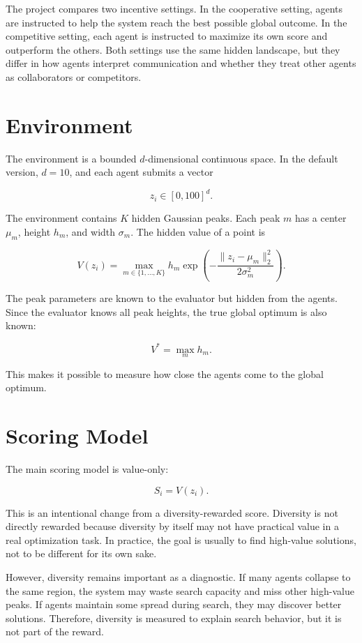 \documentclass[11pt]{article}
\begin{document}
The project compares two incentive settings. In the cooperative setting, agents are instructed to help the system reach the best possible global outcome. In the competitive setting, each agent is instructed to maximize its own score and outperform the others. Both settings use the same hidden landscape, but they differ in how agents interpret communication and whether they treat other agents as collaborators or competitors.

\section{Environment}

The environment is a bounded $d$-dimensional continuous space. In the default version, $d=10$, and each agent submits a vector

\[
z_i \in [0,100]^d.
\]

The environment contains $K$ hidden Gaussian peaks. Each peak $m$ has a center $\mu_m$, height $h_m$, and width $\sigma_m$. The hidden value of a point is

\[
V(z_i) = \max_{m \in \{1,\ldots,K\}}
h_m \exp\left(-\frac{\lVert z_i-\mu_m\rVert_2^2}{2\sigma_m^2}\right).
\]

The peak parameters are known to the evaluator but hidden from the agents. Since the evaluator knows all peak heights, the true global optimum is also known:

\[
V^* = \max_m h_m.
\]

This makes it possible to measure how close the agents come to the global optimum.

\section{Scoring Model}

The main scoring model is value-only:

\[
S_i = V(z_i).
\]

This is an intentional change from a diversity-rewarded score. Diversity is not directly rewarded because diversity by itself may not have practical value in a real optimization task. In practice, the goal is usually to find high-value solutions, not to be different for its own sake.

However, diversity remains important as a diagnostic. If many agents collapse to the same region, the system may waste search capacity and miss other high-value peaks. If agents maintain some spread during search, they may discover better solutions. Therefore, diversity is measured to explain search behavior, but it is not part of the reward.
\end{document}
